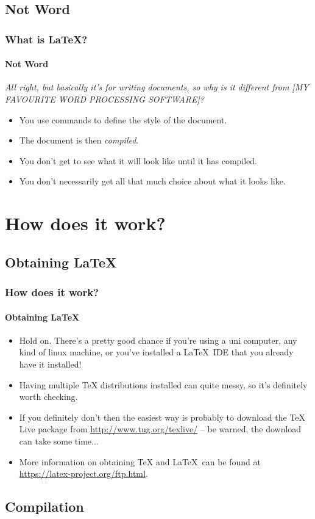 \documentclass{beamer}
\begin{document}
\subsection{Not Word}
\begin{frame}
\frametitle{What is \LaTeX?}
\framesubtitle{Not Word}
\emph{All right, but basically it's for writing documents, so why is it different from [MY FAVOURITE WORD PROCESSING SOFTWARE]?}
\vspace{\baselineskip}
\begin{itemize}
\item You use commands to define the style of the document.
\item The document is then \emph{compiled}.
\item You don't get to see what it will look like until it has compiled.
\item You don't necessarily get all that much choice about what it looks like.
\end{itemize}
\end{frame}

\section{How does it work?}

\subsection{Obtaining \LaTeX}
\begin{frame}
\frametitle{How does it work?}
\framesubtitle{Obtaining \LaTeX}
\begin{itemize}
\item \alert{Hold on.} There's a pretty good chance if you're using a uni computer, any kind of linux machine, or you've installed a \LaTeX\ IDE that you already have it installed!
\item Having multiple TeX distributions installed can quite messy, so it's definitely worth checking.
\item If you definitely don't then the easiest way is probably to download the TeX Live package from \url{http://www.tug.org/texlive/} -- be warned, the download can take some time...
\item More information on obtaining TeX and \LaTeX\ can be found at \url{https://latex-project.org/ftp.html}.
\end{itemize}
\end{frame}

\subsection{Compilation}
\end{document}
